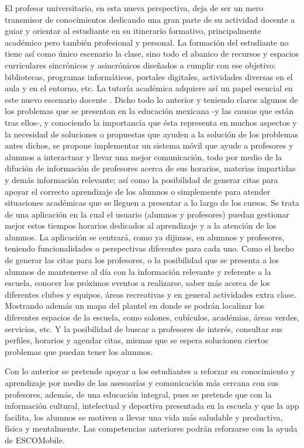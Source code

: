 \noindent
El profesor universitario, en esta nueva perspectiva, deja de ser un mero transmisor de conocimientos 
dedicando una gran parte de su actividad docente a guiar y orientar al estudiante en su itinerario 
formativo, principalmente académico pero también profesional y personal. La formación del estudiante no 
tiene así como único escenario la clase, sino todo el abanico de recursos y espacios curriculares 
sincrónicos y asincrónicos diseñados a cumplir con ese objetivo: bibliotecas, programas informáticos, 
portales digitales, actividades diversas en el aula y en el entorno, etc. La tutoría académica adquiere  
así un papel esencial en este nuevo escenario docente \cite{Tutoria}.
\noindent
Dicho todo lo anterior y teniendo claros algunos de los problemas que se presentan en la educación mexicana 
-y las causas que están tras ellos-, y conociendo la importancia que ésta representa en muchos aspectos y 
la necesidad de soluciones o propuestas que ayuden a la solución de los problemas antes dichos, se propone 
implementar un sistema móvil que ayude a profesores y alumnos a interactuar y llevar una mejor 
comunicación, todo por medio de la difución de información de profesores acerca de sus horarios, materias 
impartidas y demás información relevante; así como la posibilidad de generar citas para apoyar el correcto
aprendizaje de los alumnos o simplemente para atender situaciones académicas que se lleguen a presentar a
lo largo de los cursos.
Se trata de una aplicación en la cual el usuario (alumnos y profesores) puedan gestionar mejor estos 
tiempos horarios dedicados al aprendizaje y a la atención de los alumnos. La aplicación se centrará, como 
ya dijimos, en alumnos y profesores, teniendo funcionalidades o perspectivas diferentes para cada uno. Como 
el hecho de generar las citas para los profesores, o la posibilidad que se presenta a los alumnos de 
mantenerse al día con la información relevante y referente a la escuela, conocer los próximos eventos a 
realizarse, saber más acerca de los diferentes clubes y equipos, áreas recreativas y en general actividades 
extra clase. Mostrando además un mapa del plantel en donde se podrán localizar los diferentes espacios de 
la escuela, como salones, cubículos, académias, áreas verdes, servicios, etc. Y la posibilidad de buscar a 
profesores de interés, consultar sus perfiles, horarios y agendar citas, mismas que se espera solucionen 
ciertos problemas que puedan tener los alumnos. 

\noindent
Con lo anterior se pretende apoyar a los estudiantes a reforzar su conocimiento y aprendizaje por medio de 
las asesoarías y comunicación más cercana con sus profesores, además, de una educación integral, pues se 
pretende que con la información cultural, intelectual y deportiva presentada en la escuela y que la app 
facilita, los alumnos se motiven a llevar una vida más saludable y productiva, física y mentalmente. Las 
competencias anteriores podrán reforzarse con la ayuda de ESCOMobile.